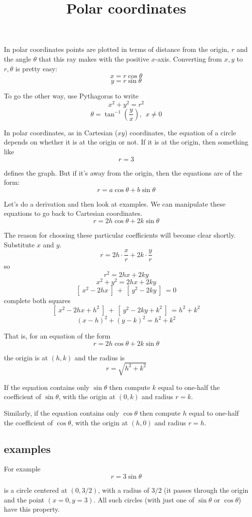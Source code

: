 \documentclass[11pt, oneside]{article}
\title{Polar coordinates}
\date{}
\begin{document}
\maketitle
\Large
In polar coordinates points are plotted in terms of distance from the origin, $r$ and the angle $\theta$ that this ray makes with the positive $x$-axis.  Converting from $x,y$ to $r, \theta$ is pretty easy:
\[ x = r \cos \theta \]
\[ y = r \sin \theta \]

To go the other way, use Pythagoras to write 
\[ x^2 + y^2 = r^2 \]
\[ \theta = \tan^{-1} (\frac{y}{x}), \ \ x \ne 0 \]

In polar coordinates, as in Cartesian ($xy$) coordinates, the equation of a circle depends on whether it is at the origin or not.  If it is at the origin, then something like
\[ r = 3 \]

defines the graph.  But if it's away from the origin, then the equations are of the form:
\[ r = a \cos \theta + b \sin \theta \]

Let's do a derivation and then look at examples.  We can manipulate these equations to go back to Cartesian coordinates.
\[ r = 2h \cos \theta + 2k \sin \theta \]

The reason for choosing these particular coefficients will become clear shortly.  Substitute  $x$ and $y$.
\[ r = 2h \cdot \frac{x}{r} + 2k \cdot \frac{y}{r} \]
so 
\[ r^2 = 2hx + 2ky \]
\[ x^2 + y^2 = 2hx + 2ky \]
\[ [ \ x^2 - 2hx  \ ] \ + \  [ \ y^2 - 2ky  \ ]  \ = 0 \]
complete both squares
\[ [ \ x^2 - 2hx + h^2 \ ] \ + \  [ \ y^2 - 2ky + k^2 \ ]  \ = h^2 + k^2 \]
\[ (x - h)^2 + (y - k)^2 = h^2 + k^2 \]

That is, for an equation of the form
\[ r = 2h \cos \theta + 2k \sin \theta \]

the origin is at $(h,k)$ and the radius is
\[ r = \sqrt{h^2 + k^2} \]

If the equation contains only $\sin \theta$ then compute $k$ equal to one-half the coefficient of $\sin \theta$, with the origin at $(0,k)$ and radius $r = k$.

Similarly, if the equation contains only $\cos \theta$ then compute $h$ equal to one-half the coefficient of $\cos \theta$, with the origin at $(h,0)$ and radius $r = h$.

\subsection*{examples}
For example
\[ r = 3 \sin \theta \]

is a circle centered at $(0,3/2)$, with a radius of $3/2$ (it passes through the origin and the point $(x=0,y=3)$.  All such circles (with just one of $\sin \theta$ or $\cos \theta$) have this property.
\end{document}
